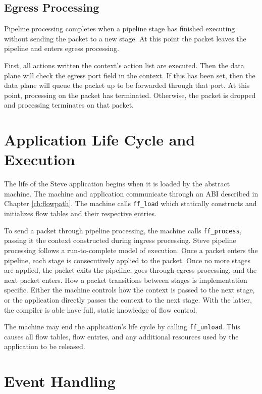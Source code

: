 \subsection{Egress Processing} \label{egress_desc}

Pipeline processing completes when a pipeline stage has finished executing
without sending the packet to a new stage. At this point the packet leaves the
pipeline and enters egress processing.

First, all actions written the context's action list are executed. Then the data
plane will check the egress port field in the context. If this has been set,
then the data plane will queue the packet up to be forwarded through that port.
At this point, processing on the packet has terminated.
Otherwise, the packet is dropped and processing terminates on that packet.

\section{Application Life Cycle and Execution}

The life of the Steve application begins when it is loaded by the abstract machine. The machine and application communicate through an ABI described in Chapter \ref{ch:flowpath}. The machine calls \texttt{ff\_load} which statically constructs and initializes flow tables and their respective entries.

To send a packet through pipeline processing, the machine calls \texttt{ff\_process}, passing it the context constructed during ingress processing.
Steve pipeline processing follows a run-to-complete model of execution. Once a
packet enters the pipeline, each stage is consecutively applied to
the packet. Once no more stages are applied, the packet exits the pipeline, goes through egress processing, and
the next packet enters. 
How a packet transitions between stages is implementation specific. Either the machine controls how the context is passed to the next stage, or the application directly passes the context to the next stage. With the latter, the compiler is able have full, static knowledge of flow control.

The machine may end the application's life cycle by calling \texttt{ff\_unload}. This causes all flow tables, flow entries, and any additional resources used by the application to be released.

\section{Event Handling} \label{events_desc}

